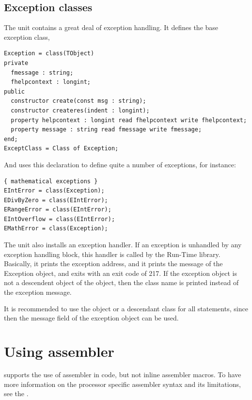 \section{Exception classes}
\label{se:exceptclasses}
The  unit contains a great deal of exception handling.
It defines the base exception class, 
\begin{verbatim}
Exception = class(TObject)
private
  fmessage : string;
  fhelpcontext : longint;
public
  constructor create(const msg : string);
  constructor createres(indent : longint);
  property helpcontext : longint read fhelpcontext write fhelpcontext;
  property message : string read fmessage write fmessage;
end;
ExceptClass = Class of Exception;
\end{verbatim}
And uses this declaration to define quite a number of exceptions, for
instance:
\begin{verbatim}
{ mathematical exceptions }
EIntError = class(Exception);
EDivByZero = class(EIntError);
ERangeError = class(EIntError);
EIntOverflow = class(EIntError);
EMathError = class(Exception);
\end{verbatim}
The  unit also installs an exception handler. If an exception is
unhandled by any exception handling block, this handler is called by the
Run-Time library. Basically, it prints the exception address, and it prints
the message of the Exception object, and exits with an exit code of 217.
If the exception object is not a descendent object of the 
object, then the class name is printed instead of the exception message.

It is recommended to use the  object or a descendant class
for all  statements, since then the message
field of the exception object can be used.

\chapter{Using assembler}
\fpc supports the use of assembler in code, but not inline
assembler macros.  To have more information on the processor
specific assembler syntax and its limitations, see the \progref.

